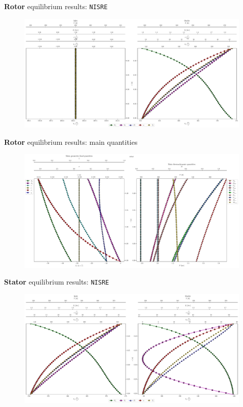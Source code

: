 	\begin{frame}{\textbf{Rotor} equilibrium results: \texttt{NISRE}}
		\begin{figure}
			\centering
			\includegraphics[width=1\textwidth]{figures/rotorEntropyFlow.pdf}
		\end{figure}
	\end{frame}
	
	\begin{frame}{\textbf{Rotor} equilibrium results: main quantities}
		\begin{figure}
			\centering
			\includegraphics[width=1\textwidth]{figures/rotorBetaThermo.pdf}
		\end{figure}
	\end{frame}
	
	\begin{frame}{\textbf{Stator} equilibrium results: \texttt{NISRE}}
		\begin{figure}
			\centering
			\includegraphics[width=1\textwidth]{figures/statorEntropyFlow.pdf}
		\end{figure}
	\end{frame}
	
